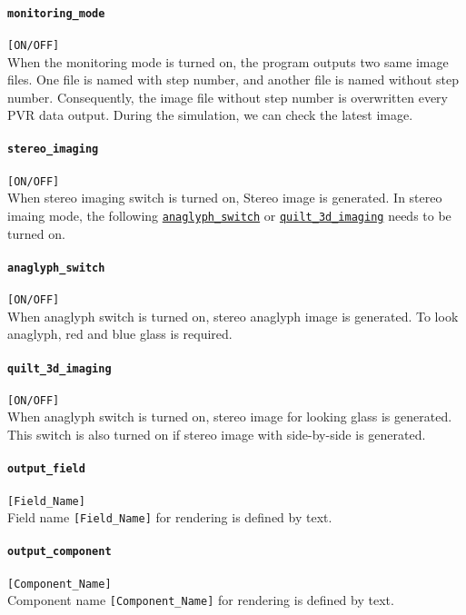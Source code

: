 \paragraph{\tt monitoring\_mode}
\label{href_t:monitoring_mode}  
\verb|[ON/OFF]| \\
When the monitoring mode is turned on, the program outputs two same image files. One file is named with step number, and another file is named without step number. Consequently, the image file without step number is overwritten every PVR data output. During the simulation, we can check the latest image.
%
\paragraph{\tt stereo\_imaging}
\label{href_t:stereo_imaging}  
\verb|[ON/OFF]| \\
When stereo imaging switch is turned on, Stereo image is generated. In stereo imaing mode, the following \hyperref[href_t:anaglyph_switch]{\tt anaglyph\_switch} or \hyperref[href_t:quilt_3d_imaging]{\tt quilt\_3d\_imaging} needs to be turned on.
%
\paragraph{\tt anaglyph\_switch}
\label{href_t:anaglyph_switch}  
\verb|[ON/OFF]| \\
When anaglyph switch is turned on, stereo anaglyph image is generated. To look anaglyph, red and blue glass is required.
%
\paragraph{\tt quilt\_3d\_imaging}
\label{href_t:quilt_3d_imaging}  
\verb|[ON/OFF]| \\
When anaglyph switch is turned on, stereo image for looking glass is generated. This switch is also turned on if stereo image with side-by-side is generated.
%
\paragraph{\tt output\_field}
\label{href_t:output_field}  
\verb|[Field_Name]| \\
Field name \verb|[Field_Name]| for rendering is defined by text.
%
\paragraph{\tt output\_component}
\label{href_t:output_component}  
\verb|[Component_Name]| \\
Component name \verb|[Component_Name]| for rendering is defined by text.
%
